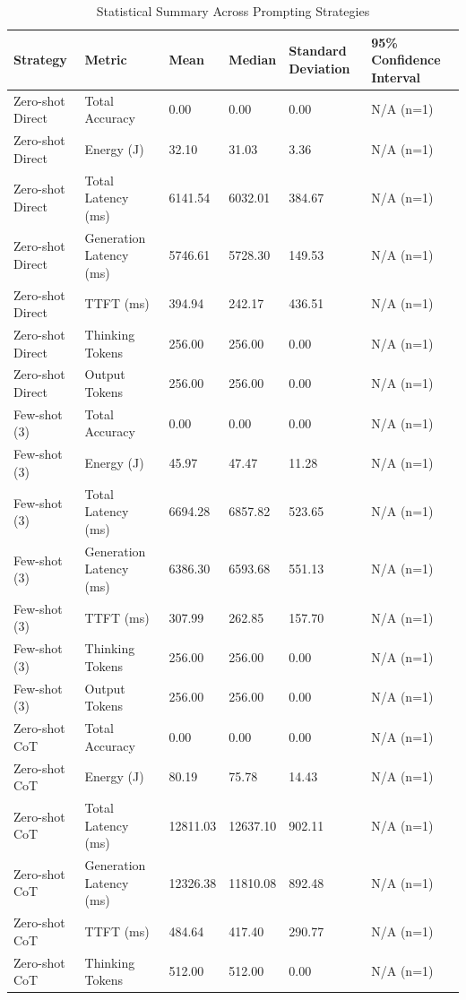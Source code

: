 \begin{table}
\caption{Statistical Summary Across Prompting Strategies}
\label{tab:statistical_summary}
\begin{tabular}{llllll}
\toprule
Strategy & Metric & Mean & Median & Standard Deviation & 95\% Confidence Interval \\
\midrule
Zero-shot Direct & Total Accuracy & 0.00 & 0.00 & 0.00 & N/A (n=1) \\
Zero-shot Direct & Energy (J) & 32.10 & 31.03 & 3.36 & N/A (n=1) \\
Zero-shot Direct & Total Latency (ms) & 6141.54 & 6032.01 & 384.67 & N/A (n=1) \\
Zero-shot Direct & Generation Latency (ms) & 5746.61 & 5728.30 & 149.53 & N/A (n=1) \\
Zero-shot Direct & TTFT (ms) & 394.94 & 242.17 & 436.51 & N/A (n=1) \\
Zero-shot Direct & Thinking Tokens & 256.00 & 256.00 & 0.00 & N/A (n=1) \\
Zero-shot Direct & Output Tokens & 256.00 & 256.00 & 0.00 & N/A (n=1) \\
Few-shot (3) & Total Accuracy & 0.00 & 0.00 & 0.00 & N/A (n=1) \\
Few-shot (3) & Energy (J) & 45.97 & 47.47 & 11.28 & N/A (n=1) \\
Few-shot (3) & Total Latency (ms) & 6694.28 & 6857.82 & 523.65 & N/A (n=1) \\
Few-shot (3) & Generation Latency (ms) & 6386.30 & 6593.68 & 551.13 & N/A (n=1) \\
Few-shot (3) & TTFT (ms) & 307.99 & 262.85 & 157.70 & N/A (n=1) \\
Few-shot (3) & Thinking Tokens & 256.00 & 256.00 & 0.00 & N/A (n=1) \\
Few-shot (3) & Output Tokens & 256.00 & 256.00 & 0.00 & N/A (n=1) \\
Zero-shot CoT & Total Accuracy & 0.00 & 0.00 & 0.00 & N/A (n=1) \\
Zero-shot CoT & Energy (J) & 80.19 & 75.78 & 14.43 & N/A (n=1) \\
Zero-shot CoT & Total Latency (ms) & 12811.03 & 12637.10 & 902.11 & N/A (n=1) \\
Zero-shot CoT & Generation Latency (ms) & 12326.38 & 11810.08 & 892.48 & N/A (n=1) \\
Zero-shot CoT & TTFT (ms) & 484.64 & 417.40 & 290.77 & N/A (n=1) \\
Zero-shot CoT & Thinking Tokens & 512.00 & 512.00 & 0.00 & N/A (n=1) \\

\end{tabular}
\end{table}

